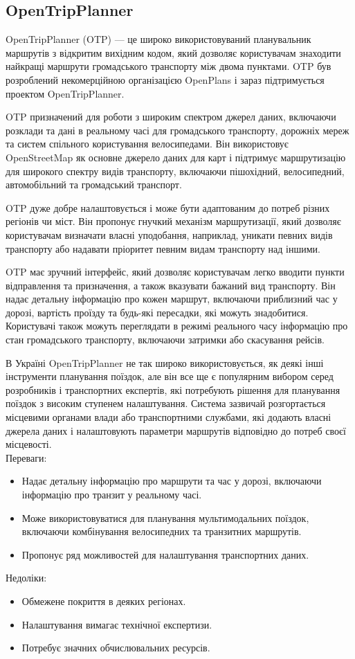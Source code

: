 \subsection{OpenTripPlanner}
\label{subsec:otp-subsection}

OpenTripPlanner (OTP) --- це широко використовуваний планувальник 
маршрутів з відкритим вихідним кодом, який дозволяє користувачам 
знаходити найкращі маршрути громадського транспорту між двома 
пунктами. OTP був розроблений некомерційною організацією OpenPlans і 
зараз підтримується проектом OpenTripPlanner.

OTP призначений для роботи з широким спектром джерел даних, включаючи 
розклади та дані в реальному часі для громадського транспорту, 
дорожніх мереж та систем спільного користування велосипедами. Він 
використовує OpenStreetMap як основне джерело даних для карт і 
підтримує маршрутизацію для широкого спектру видів транспорту, 
включаючи пішохідний, велосипедний, автомобільний та громадський 
транспорт.

OTP дуже добре налаштовується і може бути адаптованим до потреб різних 
регіонів чи міст. Він пропонує гнучкий механізм маршрутизації, який 
дозволяє користувачам визначати власні уподобання, наприклад, уникати 
певних видів транспорту або надавати пріоритет певним видам транспорту 
над іншими.

OTP має зручний інтерфейс, який дозволяє користувачам легко вводити 
пункти відправлення та призначення, а також вказувати бажаний вид 
транспорту. Він надає детальну інформацію про кожен маршрут, включаючи 
приблизний час у дорозі, вартість проїзду та будь-які пересадки, які 
можуть знадобитися. Користувачі також можуть переглядати в режимі 
реального часу інформацію про стан громадського транспорту, включаючи 
затримки або скасування рейсів.

В Україні OpenTripPlanner не так широко використовується, як деякі 
інші інструменти планування поїздок, але він все ще є популярним 
вибором серед розробників і транспортних експертів, які потребують 
рішення для планування поїздок з високим ступенем налаштування. 
Система зазвичай розгортається місцевими органами влади або 
транспортними службами, які додають власні джерела даних і 
налаштовують параметри маршрутів відповідно до потреб своєї місцевості.\\


Переваги:
\begin{itemize}
    \item Надає детальну інформацію про маршрути та час у дорозі, 
    включаючи інформацію про транзит у реальному часі.
    \item Може використовуватися для планування мультимодальних 
    поїздок, включаючи комбінування велосипедних та транзитних 
    маршрутів.
    \item Пропонує ряд можливостей для налаштування транспортних даних.

\end{itemize}

Недоліки:
\begin{itemize}
    \item Обмежене покриття в деяких регіонах.
    \item Налаштування вимагає технічної експертизи.
    \item Потребує значних обчислювальних ресурсів.
\end{itemize}
